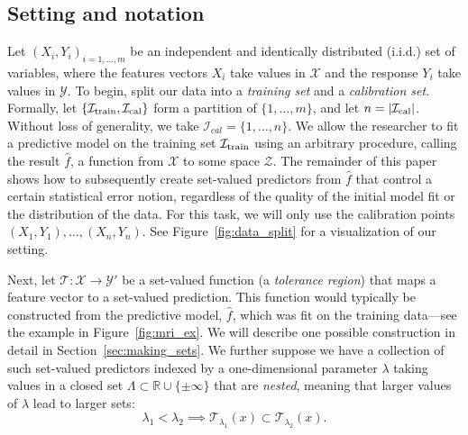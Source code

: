 \documentclass[10pt]{article}
\def\Ical{\mathcal{I}}
\def\R{\mathbb{R}}
\newcommand{\Y}{\mathcal{Y}}
\newcommand{\X}{\mathcal{X}}
\newcommand{\T}{\mathcal{T}}
\begin{document}
\subsection{Setting and notation}

Let $(X_i, Y_i)_{i = 1,\dots,m}$ be an independent and identically distributed (i.i.d.) set of variables, where the features vectors $X_i$ take values in $\X$ and the response $Y_i$ take values in $\Y$. To begin, split our data into a \emph{training set} and a \emph{calibration set}. Formally, let $\{\Ical_{\textnormal{train}}, \Ical_{\textnormal{cal}}\}$ form a partition of $\{1,\dots,m\}$, and let $n = |\Ical_{\textnormal{cal}}|$. Without loss of generality, we take $\Ical_{cal} = \{1,\dots,n\}$.
We allow the researcher to fit a predictive model on the training set $\Ical_{\textnormal{train}}$ using an arbitrary procedure, calling the result $\hat{f}$, a function from $\X$ to some space $\mathcal{Z}$.
The remainder of this paper shows how to subsequently create set-valued predictors from $\hat{f}$ that control a certain statistical error notion, regardless of the quality of the initial model fit or the distribution of the data.  For this task, we will only use the calibration points $(X_1,Y_1),\dots, (X_n,Y_n)$. See Figure~\ref{fig:data_split} for a visualization of our setting.

Next, let $\T : \X \to \Y'$ be a set-valued function (a \emph{tolerance region}) that maps a feature vector to a set-valued prediction. This function would typically be constructed from the predictive model, $\hat{f}$, which was fit on the training data---see the example in Figure~\ref{fig:mri_ex}. We will describe one possible construction in detail in Section~\ref{sec:making_sets}.
We further suppose we have a collection of such set-valued predictors indexed by a one-dimensional parameter $\lambda$ taking values in a closed set $\Lambda \subset \R \cup \{\pm\infty\}$ that are {\em nested}, meaning that larger values of $\lambda$ lead to larger sets:
\begin{equation}
\label{eq:nested_sets}
    \lambda_1 < \lambda_2 \implies \T_{\lambda_1}(x) \subset \T_{\lambda_2}(x).
\end{equation}
\end{document}
